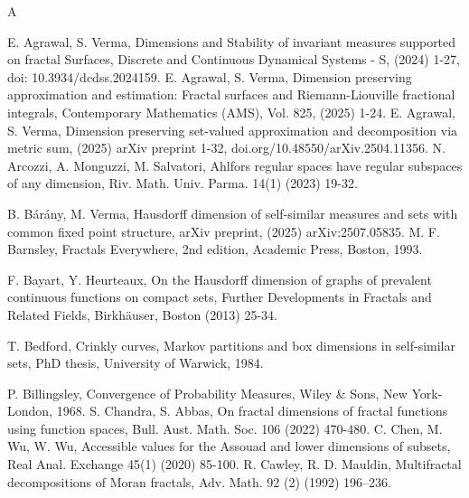 \documentclass{amsproc}
\theoremstyle{definition}
\theoremstyle{remark}
\numberwithin{equation}{section}
\begin{document}

\begin{thebibliography}{A}

 E. Agrawal, S. Verma, Dimensions and Stability of invariant measures supported on fractal Surfaces, Discrete and Continuous Dynamical Systems - S, (2024) 1-27, doi: 10.3934/dcdss.2024159.
  E. Agrawal, S. Verma, Dimension preserving approximation and estimation: Fractal surfaces and Riemann-Liouville fractional integrals, Contemporary Mathematics (AMS), Vol. 825, (2025) 1-24.
 E. Agrawal, S. Verma, Dimension preserving set-valued approximation and decomposition via metric sum, (2025) arXiv preprint  1-32, 
doi.org/10.48550/arXiv.2504.11356.
 N. Arcozzi, A. Monguzzi, M. Salvatori, Ahlfors regular spaces have regular subspaces of any dimension, Riv. Math. Univ. Parma. 14(1) (2023) 19-32.



 B. B\'ar\'any, M. Verma, Hausdorff dimension of self-similar measures and sets with common fixed point structure, arXiv preprint, (2025) arXiv:2507.05835.
 M. F. Barnsley, Fractals Everywhere, 2nd edition, Academic Press, Boston, 1993.


 F. Bayart, Y. Heurteaux,
On the Hausdorff dimension of graphs of prevalent continuous functions on compact sets,
Further Developments in Fractals and Related Fields, Birkhäuser, Boston (2013) 25-34.


 T. Bedford, Crinkly curves, Markov partitions and box dimensions in self-similar sets, PhD thesis, University of Warwick, 1984.


 P. Billingsley, Convergence of Probability Measures, Wiley \& Sons, New York- London, 1968.
 S. Chandra, S. Abbas, On fractal dimensions of fractal functions using function spaces, Bull. Aust. Math. Soc. 106 (2022) 470-480.
 C. Chen, M. Wu, W. Wu, Accessible values for the Assouad and lower dimensions of subsets, Real Anal. Exchange 45(1) (2020) 85-100. 
 R. Cawley, R. D. Mauldin, Multifractal decompositions of Moran fractals, Adv. Math. 92 (2)
(1992) 196–236.


\end{thebibliography}
\end{document}
